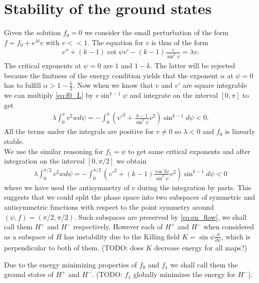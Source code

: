 \section{Stability of the ground states}
\label{sec:stab-ground-stat}

Given the solution $f_0=0$ we consider the small perturbation of the
form $f=f_0+e^{\lambda t} v$ with $v<<1$. The equation for $v$ is thus
of the form
\begin{align}\label{eq:f0_L}
  v''+(k-1)\cot\psi v'-(k-1)\frac{v}{\sin^2\psi}=\lambda v.
\end{align}
The critical exponents at $\psi=0$ are $1$ and $1-k$. The latter will
be rejected because the finitness of the energy condition yields that
the exponent $\alpha$ at $\psi=0$ has to fulfill
$\alpha>1-\frac{k}{2}$. Now when we know that $v$ and $v'$ are square
integrable we can multiply \eqref{eq:f0_L} by $v\sin^{k-1}\psi$ and
integrate on the interval $[0,\pi]$ to get
\begin{align}
  \lambda\int_0^\pi v^2w d\psi=-\int_0^\pi\left(v'^2+\frac{k-1}{\sin^2\psi}v^2\right)\sin^{k-1}d\psi<0.
\end{align}
All the terms under the integrals are positive for $v\ne0$ so
$\lambda<0$ and $f_0$ is linearly stable.\\

We use the similar reasoning for $f_1=\psi$ to get same critical
exponents and after integration on the interval $[0,\pi/2]$ we obtain
\begin{align}
  \label{eq:f1_lambda}
  \lambda\int_0^{\pi/2} v^2w d\psi=-\int_0^{\pi/2}\left(v'^2+(k-1)\frac{\cos2\psi}{\sin^2\psi}v^2\right)\sin^{k-1}d\psi<0
\end{align}
where we have used the antisymmetry of $v$ during the integration by
parts. This suggests that we could split the phase space into two
subspaces of symmetric and antisymmetric functions with respect to the
point symmetry around $(\psi,f)=(\pi/2,\pi/2)$. Such subspaces are
preserved by \eqref{eq:en_flow}, we shall call them $H^+$ and $H^-$
respectively. However each of $H^+$ and $H^-$ when considered as a
subspace of $H$ has instability due to the Killing field
$K=\sin\psi\frac{\partial}{\partial\psi}$, which is perpendicular to
both of them. (TODO: does $K$ decrease energy for all maps?)

Due to the energy minimizing properties of $f_0$ and $f_1$ we shall
call them the ground states of $H^+$ and $H^-$. (TODO: $f_1$ globally
minimizes the energy for $H^-$).


